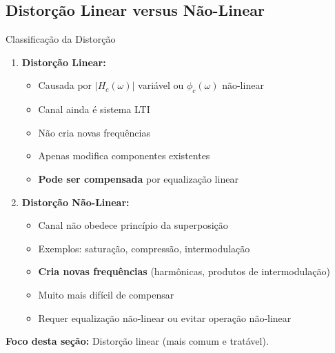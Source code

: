 
\subsection{Distorção Linear versus Não-Linear}

\begin{frame}{Classificação da Distorção}

\begin{enumerate}
\item \textbf{Distorção Linear:}
   \begin{itemize}
   \item Causada por $|H_c(\omega)|$ variável ou $\phi_c(\omega)$ não-linear
   \item Canal ainda é sistema LTI
   \item Não cria novas frequências
   \item Apenas modifica componentes existentes
   \item \textbf{Pode ser compensada} por equalização linear
   \end{itemize}

\item \textbf{Distorção Não-Linear:}
   \begin{itemize}
   \item Canal não obedece princípio da superposição
   \item Exemplos: saturação, compressão, intermodulação
   \item \textbf{Cria novas frequências} (harmônicas, produtos de intermodulação)
   \item Muito mais difícil de compensar
   \item Requer equalização não-linear ou evitar operação não-linear
   \end{itemize}
\end{enumerate}

\vspace{0.1cm}

\textbf{Foco desta seção:} Distorção linear (mais comum e tratável).

\end{frame}


